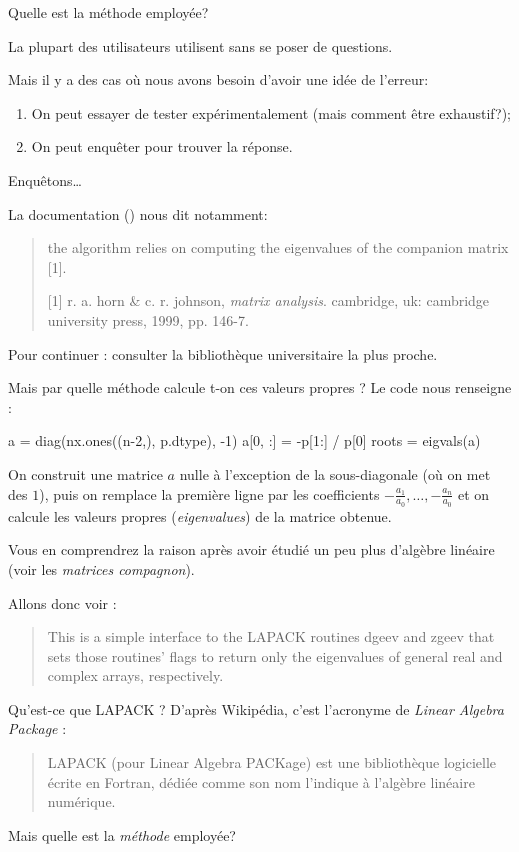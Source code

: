 Quelle est la méthode employée?

La plupart des utilisateurs utilisent  sans se
poser de questions.

Mais il y a des cas où nous avons besoin d'avoir une idée de l'erreur:
\begin{enumerate}
\item On peut essayer de tester expérimentalement (mais comment être
  exhaustif?);
\item On peut enquêter pour trouver la réponse.
\end{enumerate}

Enquêtons\ldots{}

La documentation () nous dit notamment:
\begin{quote}
the algorithm relies on computing the eigenvalues of the
companion matrix [1].

[1] r. a. horn \& c. r. johnson, \emph{matrix analysis}.  cambridge, uk:
    cambridge university press, 1999, pp. 146-7.
\end{quote}
Pour continuer : consulter la bibliothèque universitaire la plus proche.
\medskip

Mais par quelle méthode calcule t-on ces valeurs propres ?
Le code nous renseigne :
\begin{pyverbatim}
a = diag(nx.ones((n-2,), p.dtype), -1)
a[0, :] = -p[1:] / p[0]
roots = eigvals(a)
\end{pyverbatim}
On construit une matrice $a$ nulle à l'exception de la sous-diagonale
(où on met des $1$), puis on remplace la première ligne par les
coefficients $-\frac{a_{1}}{a_{0}}, \ldots, -\frac{a_{n}}{a_{0}}$ et
on calcule les valeurs propres (\textit{eigenvalues}) de la matrice
obtenue.

Vous en comprendrez la raison après avoir étudié un peu plus d'algèbre linéaire (voir les \emph{matrices compagnon}).

\medskip

Allons donc voir  :
\begin{quote}
This is a simple interface to the LAPACK routines dgeev and zgeev
that sets those routines' flags to return only the eigenvalues of
general real and complex arrays, respectively.
\end{quote}

Qu'est-ce que LAPACK ? D'après Wikipédia, c'est l'acronyme de \emph{Linear Algebra Package} : 
\begin{quote}
LAPACK (pour Linear Algebra PACKage) est une bibliothèque logicielle
écrite en Fortran, dédiée comme son nom l'indique à l'algèbre linéaire
numérique.
\end{quote}
Mais quelle est la \emph{méthode} employée?

